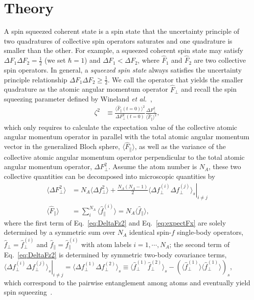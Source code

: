\documentclass[aps,pra,twocolumn,superscriptaddress]{revtex4-1} %
\newcommand{\expect}[1]{\big\langle #1 \big\rangle}
\begin{document}
\section{Theory} \label{Sec::Theory}

A  spin squeezed coherent state  is a spin state that the uncertainty principle of two quadratures of collective spin operators saturates and one quadrature is smaller than the other. 
For example, a squeezed coherent spin state may satisfy $ \Delta F_1\Delta F_2=\frac{1}{2} $ (we set $ \hbar=1 $) and $ \Delta F_1<\Delta F_2 $, where $ \hat{F}_1 $ and $ \hat{F}_2 $ are two collective spin operators. 
In general, a \textit{squeezed spin state} always satisfies the uncertainty principle relationship $ \Delta F_1\Delta F_2\ge\frac{1}{2} $.
We call the operator that yields the smaller quadrature as the atomic angular momentum operator $ \hat{F}_\perp $ and 
recall the spin squeezing parameter defined by Wineland {\emph{et al.}}~\cite{Wineland1992},
\begin{align}
\zeta^2 &\equiv \frac{\expect{\hat{F}_\parallel(t=0)}^2}{\Delta F_\perp^2(t=0)} \frac{\Delta F_\perp^2}{\expect{\hat{F}_\parallel}^2},
\end{align}
which only requires to calculate the expectation value of the collective atomic angular momentum operator in parallel with the total atomic angular momentum vector in the generalized Bloch sphere, $ \expect{\hat{F}_\parallel} $, as well as the variance of the collective atomic angular momentum operator perpendicular to the total atomic angular momentum operator, $ \Delta F_\perp^2 $. 
Assume the atom number is $ N_A $, these two collective quantities can be decomposed into microscopic quantities by 
\begin{align}
\expect{\Delta F_\perp^2} &= N_A \expect{\Delta f_\perp^2}+\frac{N_A(N_A-1)}{2}\left. \expect{\Delta f_\perp^{(i)}\Delta f_\perp^{(j)}}_s\right|_{i\neq j}\label{eq:DeltaFz2}\\
\expect{\hat{F}_\parallel } &= \sum_i^{N_A} \expect{\hat{f}_\parallel ^{(i)}}=N_A \expect{\hat{f}_\parallel},\label{eq:expectFx}
\end{align}
where the first term of Eq.~\eqref{eq:DeltaFz2} and Eq.~\eqref{eq:expectFx} are solely determined by a symmetric sum over $N_A$ identical spin-$f$ single-body operators, $ \hat{f}_\perp=\hat{f}_\perp^{(i)} $ and $ \hat{f}_\parallel=\hat{f}_\parallel^{(i)} $ with atom labels $ i=1,\cdots,N_A $; the second term of Eq.~\eqref{eq:DeltaFz2} is determined by symmetric two-body covariance terms, $ \left.\expect{\Delta f_\perp^{(i)}\Delta f_\perp^{(j)}}_s\right|_{i\neq j}=\expect{\Delta f_\perp^{(1)}\Delta f_\perp^{(2)}}_s\equiv \expect{\hat{f}_\perp^{(1)}\hat{f}_\perp^{(2)}}_s-\left( \expect{\hat{f}_\perp^{(1)}} \expect{\hat{f}_\perp^{(1)}}\right)_s $, which correspond to the pairwise entanglement among atoms and eventually yield spin squeezing~\cite{Wang2003Spin}.
\end{document}
